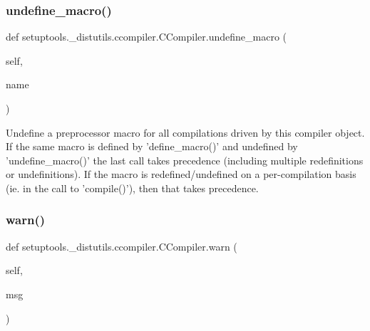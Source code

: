 \mbox{\label{classsetuptools_1_1__distutils_1_1ccompiler_1_1CCompiler_a3114db66f48a4795a372046c75de13ad}} 
\subsubsection{\texorpdfstring{undefine\+\_\+macro()}{undefine\_macro()}}
{\footnotesize\ttfamily def setuptools.\+\_\+distutils.\+ccompiler.\+C\+Compiler.\+undefine\+\_\+macro (\begin{DoxyParamCaption}\item[{}]{self,  }\item[{}]{name }\end{DoxyParamCaption})}

\begin{DoxyVerb}Undefine a preprocessor macro for all compilations driven by
this compiler object.  If the same macro is defined by
'define_macro()' and undefined by 'undefine_macro()' the last call
takes precedence (including multiple redefinitions or
undefinitions).  If the macro is redefined/undefined on a
per-compilation basis (ie. in the call to 'compile()'), then that
takes precedence.
\end{DoxyVerb}
 \mbox{\label{classsetuptools_1_1__distutils_1_1ccompiler_1_1CCompiler_a05053eb5be68cf2f96df1c6e7acf29ff}} 
\subsubsection{\texorpdfstring{warn()}{warn()}}
{\footnotesize\ttfamily def setuptools.\+\_\+distutils.\+ccompiler.\+C\+Compiler.\+warn (\begin{DoxyParamCaption}\item[{}]{self,  }\item[{}]{msg }\end{DoxyParamCaption})}



